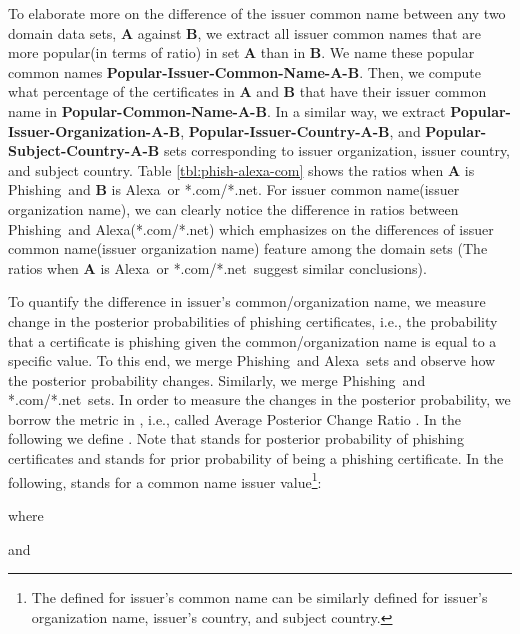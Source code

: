 \documentclass[twocolumn]{article}
\newcommand{\Alexa}{\textsf{Alexa}}
\newcommand{\phishing}{\textsf{Phishing}}
\newcommand{\comnet}{\textsf{*.com/*.net}}
\begin{document}
To elaborate more on the difference of the issuer common name between any two domain data sets, \textbf{A} against  \textbf{B}, we extract all issuer common names that are more popular(in terms of ratio) in set \textbf{A} than in \textbf{B}. We name these popular common names \textbf{Popular-Issuer-Common-Name-A-B}. Then, we compute what percentage of the certificates in \textbf{A} and \textbf{B} that have their issuer common name in \textbf{Popular-Common-Name-A-B}. In a similar way, we extract \textbf{Popular-Issuer-Organization-A-B}, \textbf{Popular-Issuer-Country-A-B}, and \textbf{Popular-Subject-Country-A-B}  sets corresponding to issuer organization, issuer country, and subject country. Table \ref{tbl:phish-alexa-com} shows the ratios when \textbf{A} is \phishing\ and \textbf{B} is \Alexa\ or \comnet. For issuer common name(issuer organization name), we can clearly notice the difference in ratios between \phishing\ and \Alexa(\comnet)  which emphasizes on the differences of issuer common name(issuer organization name) feature among the domain sets (The ratios when \textbf{A} is \Alexa\ or \comnet\ suggest similar conclusions). 

To quantify the difference in issuer's common/organization name, we measure change in the posterior probabilities of phishing certificates, i.e., the probability that a certificate is phishing given the common/organization name is equal to a specific value. To this end, we merge \phishing\ and \Alexa\ sets and observe how the posterior probability changes. Similarly, we merge \phishing\ and \comnet\ sets. In order to measure the changes in the posterior probability, we borrow the metric in \cite{ads-portal-class}, i.e., called Average Posterior Change Ratio . In the following we define . Note that  stands for posterior probability of phishing certificates and  stands for prior probability of being a phishing certificate. In the following,  stands for a common name issuer value\footnote{The  defined for issuer's common name  can be similarly defined for issuer's organization name, issuer's country, and subject country.}:

{\footnotesize
 }
where
{\footnotesize

}
and
{\footnotesize

 }
\end{document}
